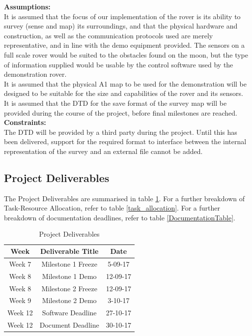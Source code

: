 \documentclass[12pt,a4paper]{article}
\begin{document}
     \textbf{Assumptions:}\\
		It is assumed that the focus of our implementation of the rover is its ability to survey (sense and map) its surroundings, and that the physical hardware and construction, as well as the communication protocols used are merely representative, and in line with the demo equipment provided. The sensors on a full scale rover would be suited to the obstacles found on the moon, but the type of information supplied would be usable by the control software used by the demonstration rover.\\
		It is assumed that the physical A1 map to be used for the demonstration will be designed to be suitable for the size and capabilities of the rover and its sensors.\\
        It is assumed that the DTD for the save format of the survey map will be provided during the course of the project, before final milestones are reached.\\
		
      \textbf{Constraints:}\\
		The DTD will be provided by a third party during the project. Until this has been delivered, support for the required format to interface between the internal representation of the survey and an external file cannot be added.\\

	\subsection{Project Deliverables}
	The Project Deliverables are summarised in table \ref{DeadlineTable}. For a further breakdown of Task-Resource Allocation, refer to table \ref{task_allocation}. For a further breakdown of documentation deadlines, refer to table \ref{DocumentationTable}.
    \begin{table}[ht]
    \centering
    \caption{Project Deliverables}
    \label{DeadlineTable}
    \begin{tabular}{|c|c|c|}
    \hline
    Week    & Deliverable Title  & Date     \\ \hline
    Week 7  & Milestone 1 Freeze & 5-09-17  \\ \hline
    Week 8  & Milestone 1 Demo   & 12-09-17 \\ \hline
    Week 8  & Milestone 2 Freeze & 12-09-17 \\ \hline
    Week 9  & Milestone 2 Demo   & 3-10-17  \\ \hline
    Week 12 & Software Deadline  & 27-10-17 \\ \hline
    Week 12 & Document Deadline  & 30-10-17 \\ \hline
    \end{tabular}
    \end{table}
\end{document}
